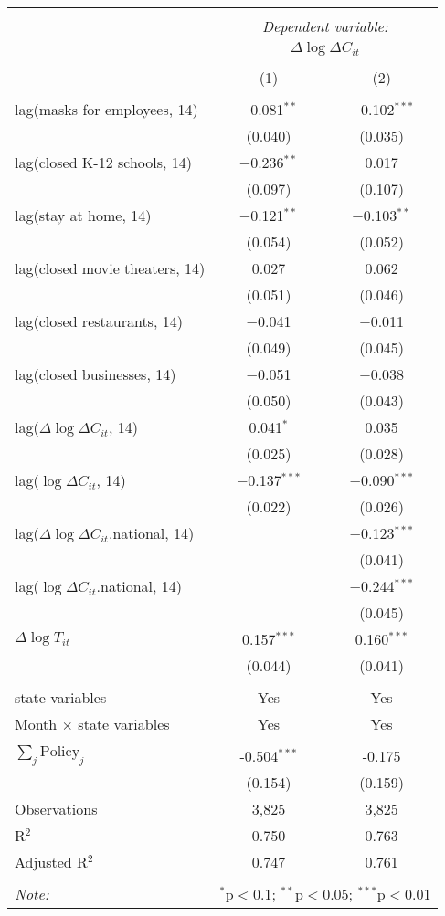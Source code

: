 \begin{tabular}{@{\extracolsep{1pt}}lcc} 
\\[-1.8ex]\hline 
\hline \\[-1.8ex] 
 & \multicolumn{2}{c}{\textit{Dependent variable:}} \\ 
\cline{2-3} 
 & \multicolumn{2}{c}{$\Delta \log \Delta C_{it}$} \\ 
\\[-1.8ex] & (1) & (2)\\ 
\hline \\[-1.8ex] 
 lag(masks for employees, 14) & $-$0.081$^{**}$ & $-$0.102$^{***}$ \\ 
  & (0.040) & (0.035) \\ 
  lag(closed K-12 schools, 14) & $-$0.236$^{**}$ & 0.017 \\ 
  & (0.097) & (0.107) \\ 
  lag(stay at home, 14) & $-$0.121$^{**}$ & $-$0.103$^{**}$ \\ 
  & (0.054) & (0.052) \\ 
  lag(closed movie theaters, 14) & 0.027 & 0.062 \\ 
  & (0.051) & (0.046) \\ 
  lag(closed restaurants, 14) & $-$0.041 & $-$0.011 \\ 
  & (0.049) & (0.045) \\ 
  lag(closed businesses, 14) & $-$0.051 & $-$0.038 \\ 
  & (0.050) & (0.043) \\ 
  lag($\Delta \log \Delta C_{it}$, 14) & 0.041$^{*}$ & 0.035 \\ 
  & (0.025) & (0.028) \\ 
  lag($\log \Delta C_{it}$, 14) & $-$0.137$^{***}$ & $-$0.090$^{***}$ \\ 
  & (0.022) & (0.026) \\ 
  lag($\Delta \log \Delta C_{it}$.national, 14) &  & $-$0.123$^{***}$ \\ 
  &  & (0.041) \\ 
  lag($\log \Delta C_{it}$.national, 14) &  & $-$0.244$^{***}$ \\ 
  &  & (0.045) \\ 
  $\Delta \log T_{it}$ & 0.157$^{***}$ & 0.160$^{***}$ \\ 
  & (0.044) & (0.041) \\ 
 \hline \\[-1.8ex] 
state variables & Yes & Yes \\ 
Month $\times$ state variables & Yes & Yes \\ 
\hline \\[-1.8ex] 
$\sum_j \mathrm{Policy}_j$ & -0.504$^{***}$ & -0.175 \\ 
 & (0.154) & (0.159) \\ 
Observations & 3,825 & 3,825 \\ 
R$^{2}$ & 0.750 & 0.763 \\ 
Adjusted R$^{2}$ & 0.747 & 0.761 \\ 
\hline 
\hline \\[-1.8ex] 
\textit{Note:}  & \multicolumn{2}{r}{$^{*}$p$<$0.1; $^{**}$p$<$0.05; $^{***}$p$<$0.01} \\ 
\end{tabular} 